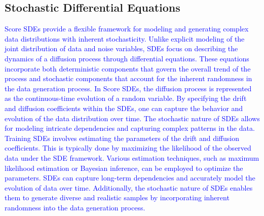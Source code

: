 \subsection{Stochastic Differential Equations}
\textcolor{blue}{Score SDEs provide a flexible framework for modeling and generating complex data distributions with inherent stochasticity. Unlike explicit modeling of the joint distribution of data and noise variables, SDEs focus on describing the dynamics of a diffusion process through differential equations. These equations incorporate both deterministic components that govern the overall trend of the process and stochastic components that account for the inherent randomness in the data generation process.
In Score SDEs, the diffusion process is represented as the continuous-time evolution of a random variable. By specifying the drift and diffusion coefficients within the SDEs, one can capture the behavior and evolution of the data distribution over time. The stochastic nature of SDEs allows for modeling intricate dependencies and capturing complex patterns in the data.
Training SDEs involves estimating the parameters of the drift and diffusion coefficients. This is typically done by maximizing the likelihood of the observed data under the SDE framework. Various estimation techniques, such as maximum likelihood estimation or Bayesian inference, can be employed to optimize the parameters.
SDEs can capture long-term dependencies and accurately model the evolution of data over time. Additionally, the stochastic nature of SDEs enables them to generate diverse and realistic samples by incorporating inherent randomness into the data generation process.}

